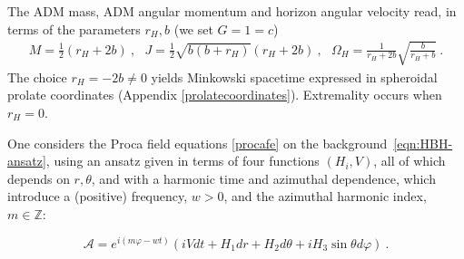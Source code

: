 The ADM mass, ADM angular momentum and horizon angular velocity read, in terms of the parameters $r_H,b$ (we set $G=1=c$)
\begin{equation}
\begin{array}{c}
M=\frac{1}{2}(r_H+2b) \ , \ \ \ 
J=\frac{1}{2}\sqrt{b(b+r_H)}(r_H+2b) \ , \ \ \
\label{Kerr2}
\displaystyle{\Omega_H=\frac{1}{r_H+2b}\sqrt{\frac{b}{r_H+b}}} \ .
\end{array}
\end{equation}
The choice $r_H=-2b\neq 0$
yields Minkowski spacetime expressed in spheroidal prolate coordinates (Appendix \ref{prolatecoordinates}). Extremality occurs when $r_H=0$.



One considers the Proca field equations \eqref{procafe} on the background~\eqref{eqn:HBH-ansatz}, using an ansatz given in terms of four functions $(H_i,V)$, all of which depends on $r,\theta$, and with a harmonic time and azimuthal dependence, which introduce a (positive) frequency, $w>0$, and the azimuthal harmonic index, $m\in \mathbb{Z}$:

\begin{equation}
\mathcal{A}=e^{i(m\varphi-w t)}\left(
 iV dt  +H_1dr+H_2d\theta+i H_3 \sin \theta d\varphi 
\right) \ .
\label{procaclouds}
\end{equation}

